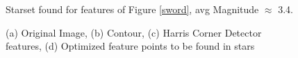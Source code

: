 \documentclass[paper=a4, fontsize=11pt]{scrartcl} %
\begin{document}
\begin{figure}[!h]
\caption{Starset found for features of Figure \ref{sword}, avg Magnitude $\approx$ 3.4. }
\label{swordss}
\end{figure}

\begin{figure}[!h]
\caption{(a) Original Image, (b) Contour, (c) Harris Corner Detector features, (d) Optimized feature points to be found in stars}
\label{mj}
\end{figure}
\end{document}
